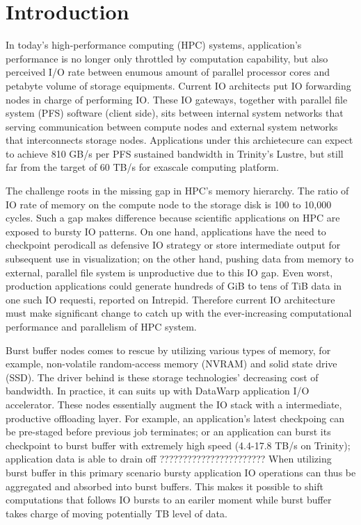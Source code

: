 \section{Introduction}

In today's high-performance computing (HPC) systems, application's performance
is no longer only throttled by computation capability, but also perceived I/O rate between
enumous amount of parallel processor cores and petabyte volume of storage equipments.
Current IO architects put IO forwarding nodes in charge of performing IO.
These IO gateways, together with parallel file system (PFS) software (client side), sits
between internal system networks that serving communication between compute nodes
and external system networks that interconnects storage nodes\cite{Ross:IOSystem}.
Applications under this archietecure can expect to achieve
810 GB/s per PFS sustained bandwidth in Trinity's Lustre\cite{TrinitySystem},
but still far from the target of 60 TB/s for exascale computing platform\cite{Shalf:HPCCS:2010}.


The challenge roots in the missing gap in HPC's memory hierarchy.
The ratio of IO rate of memory on the compute node to the storage disk
is 100 to 10,000 cycles\cite{TrinitySystem}.
Such a gap makes difference because scientific applications on HPC are exposed to
bursty IO patterns\cite{Carns:MSST:2011, Kim:PDSW:2010}.
On one hand, applications have the need to checkpoint perodicall as
defensive IO strategy\cite{Latham:CSD:2012, Naik:ICPPW:2009, Dennis:CUG:2009}
or store intermediate output for subsequent use in visualization;
on the other hand, pushing data from memory to external, parallel file system is
unproductive due to this IO gap.
Even worst, production applications could generate hundreds of GiB to tens of TiB data
in one such IO requesti, reported on Intrepid\cite{Liu:MSST:2012}.
Therefore current IO architecture must make significant change to catch up with
the ever-increasing computational performance and parallelism of HPC system.


Burst buffer nodes comes to rescue by utilizing
various types of memory, for example, non-volatile random-access memory (NVRAM) and
solid state drive (SSD).
The driver behind is these storage technologies' decreasing cost of bandwidth.
In practice, it can suits up with DataWarp application I/O accelerator\cite{DataWarp}.
These nodes essentially augment the IO stack with
a intermediate, productive offloading layer.
For example, an application's latest checkpoing can be pre-staged
before previous job terminates;
or an application can burst its checkpoint to burst buffer
with extremely high speed (4.4-17.8 TB/s on Trinity);
application data is able to drain off ???????????????????????
When utilizing burst buffer in this primary scenario
bursty application IO operations can thus be aggregated and absorbed into burst buffers.
This makes it possible to shift computations that follows IO bursts to an eariler moment
while burst buffer takes charge of moving potentially TB level of data.

